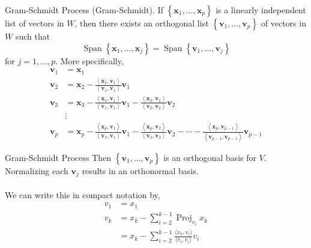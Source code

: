 \documentclass[11pt]{beamer}
\theoremstyle{plain}
\begin{document}
\begin{frame}{Gram-Schmidt Process}
    (Gram-Schmidt). If $\left\{\mathbf{x}_1, \ldots, \mathbf{x}_p\right\}$ is a linearly independent list of vectors in $W$, then there exists an orthogonal list $\left\{\mathbf{v}_1, \ldots, \mathbf{v}_p\right\}$ of vectors in $W$ such that
    $$
    \operatorname{Span}\left\{\mathbf{x}_1, \ldots, \mathbf{x}_j\right\}=\operatorname{Span}\left\{\mathbf{v}_1, \ldots, \mathbf{v}_j\right\}
    $$
for $j=1, \ldots, p$. More specifically,
$$
\begin{aligned}
\mathbf{v}_1 & =\mathbf{x}_1 \\
\mathbf{v}_2 & =\mathbf{x}_2-\frac{\left\langle\mathbf{x}_2, \mathbf{v}_1\right\rangle}{\left\langle\mathbf{v}_1, \mathbf{v}_1\right\rangle} \mathbf{v}_1 \\
\mathbf{v}_3 & =\mathbf{x}_3-\frac{\left\langle\mathbf{x}_3, \mathbf{v}_1\right\rangle}{\left\langle\mathbf{v}_1, \mathbf{v}_1\right\rangle} \mathbf{v}_1-\frac{\left\langle\mathbf{x}_3, \mathbf{v}_2\right\rangle}{\left\langle\mathbf{v}_2, \mathbf{v}_2\right\rangle} \mathbf{v}_2 \\
& \vdots \\
\mathbf{v}_p & =\mathbf{x}_p-\frac{\left\langle\mathbf{x}_p, \mathbf{v}_1\right\rangle}{\left\langle\mathbf{v}_1, \mathbf{v}_1\right\rangle} \mathbf{v}_1-\frac{\left\langle\mathbf{x}_p, \mathbf{v}_2\right\rangle}{\left\langle\mathbf{v}_2, \mathbf{v}_2\right\rangle} \mathbf{v}_2-\cdots-\frac{\left\langle\mathbf{x}_p, \mathbf{v}_{p-1}\right\rangle}{\left\langle\mathbf{v}_{p-1}, \mathbf{v}_{p-1}\right\rangle} \mathbf{v}_{p-1}
\end{aligned}
$$
\end{frame}

\begin{frame}{Gram-Schmidt Process}
Then $\left\{\mathbf{v}_1, \ldots, \mathbf{v}_p\right\}$ is an orthogonal basis for $V$. Normalizing each $\mathbf{v}_j$ results in an orthonormal basis.\\~\\
We can write this in compact notation by,
\begin{align*}
    v_1&=x_1\\
    v_k&=x_k-\sum_{i=2}^{k-1}\operatorname{Proj}_{v_i}x_k\\
    &= x_k-\sum_{i=2}^{k-1}\frac{\langle x_k,v_i \rangle}{\langle v_i,v_i \rangle}v_i
\end{align*}
\end{frame}
\end{document}
